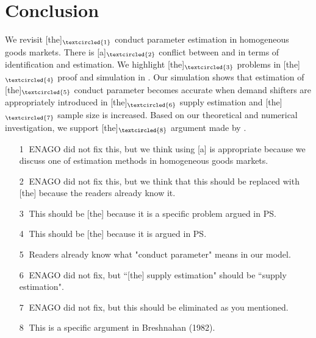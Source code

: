 \documentclass[11pt, a4paper]{article}
\begin{document}


\newpage
\section{Conclusion}
We revisit [the]$_{\textcircled{1}}$ conduct parameter estimation in homogeneous goods markets.
There is [a]$_{\textcircled{2}}$ conflict between \citet{bresnahan1982oligopoly} and \citet{perloff2012collinearity} in terms of identification and estimation.
We highlight [the]$_{\textcircled{3}}$ problems in [the]$_{\textcircled{4}}$ proof and simulation in \citet{perloff2012collinearity}.
Our simulation shows that estimation of [the]$_{\textcircled{5}}$ conduct parameter becomes accurate when demand shifters are appropriately introduced in [the]$_{\textcircled{6}}$ supply estimation and [the]$_{\textcircled{7}}$ sample size is increased. 
Based on our theoretical and numerical investigation, we support [the]$_{\textcircled{8}}$ argument made by \citet{bresnahan1982oligopoly}.

\begin{itemize}
    \item[\textcircled{1}] ENAGO did not fix this, but we think using [a] is appropriate because we discuss one of  estimation methods in homogeneous goods markets.
    \item[\textcircled{2}] ENAGO did not fix this, but we think that this should be replaced with [the] because the readers already know it.
    \item[\textcircled{3}] This should be [the] because it is a specific problem argued in PS.
    \item[\textcircled{4}] This should be [the] because it is argued in PS.
    \item[\textcircled{5}] Readers already know what "conduct parameter" means in our model.
    \item[\textcircled{6}] ENAGO did not fix, but ``[the] supply estimation" should be ``supply estimation".
    \item[\textcircled{7}] ENAGO did not fix, but this should be eliminated as you mentioned.
    \item[\textcircled{8}] This is a specific argument in Breshnahan (1982).
\end{itemize}
\end{document}
